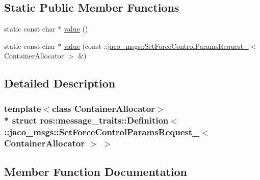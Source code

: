 \subsection*{Static Public Member Functions}
\begin{DoxyCompactItemize}
\item 
static const char $\ast$ \hyperlink{structros_1_1message__traits_1_1Definition_3_01_1_1jaco__msgs_1_1SetForceControlParamsRequest___c59584efc00e1eca7e3af5d8ad03eba5_ab32184d413a0011cb4aa158d53e2fa92}{value} ()
\item 
static const char $\ast$ \hyperlink{structros_1_1message__traits_1_1Definition_3_01_1_1jaco__msgs_1_1SetForceControlParamsRequest___c59584efc00e1eca7e3af5d8ad03eba5_a06fb767441a8c134528174d5572ad713}{value} (const \+::\hyperlink{structjaco__msgs_1_1SetForceControlParamsRequest__}{jaco\+\_\+msgs\+::\+Set\+Force\+Control\+Params\+Request\+\_\+}$<$ Container\+Allocator $>$ \&)
\end{DoxyCompactItemize}


\subsection{Detailed Description}
\subsubsection*{template$<$class Container\+Allocator$>$\\*
struct ros\+::message\+\_\+traits\+::\+Definition$<$ \+::jaco\+\_\+msgs\+::\+Set\+Force\+Control\+Params\+Request\+\_\+$<$ Container\+Allocator $>$ $>$}



\subsection{Member Function Documentation}
